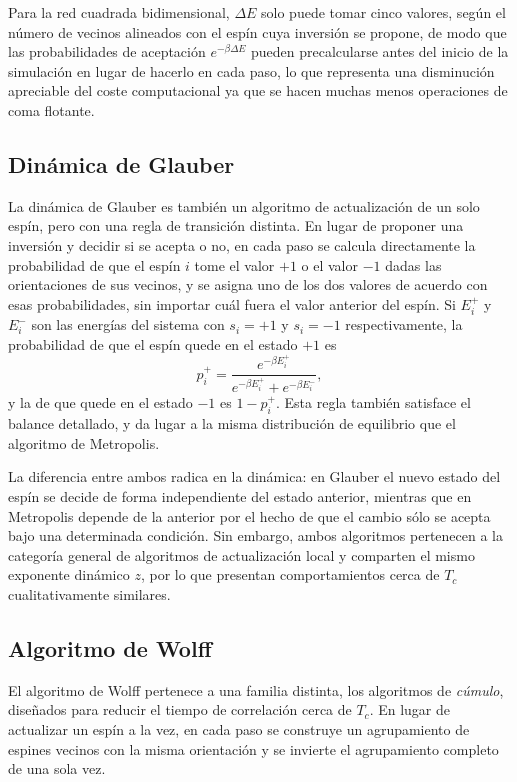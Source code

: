 Para la red cuadrada bidimensional, $\Delta E$ solo puede tomar cinco valores, según el número de vecinos alineados con el espín cuya inversión se propone, de modo que las probabilidades de aceptación $e^{-\beta\Delta E}$ pueden precalcularse antes del inicio de la simulación en lugar de hacerlo en cada paso, lo que representa una disminución apreciable del coste computacional ya que se hacen muchas menos operaciones de coma flotante.

\subsection{Dinámica de Glauber}

La dinámica de Glauber \citep{Glauber1963} es también un algoritmo de actualización de un solo espín, pero con una regla de transición distinta. En lugar de proponer una inversión y decidir si se acepta o no, en cada paso se calcula directamente la probabilidad de que el espín $i$ tome el valor $+1$ o el valor $-1$ dadas las orientaciones de sus vecinos, y se asigna uno de los dos valores de acuerdo con esas probabilidades, sin importar cuál fuera el valor anterior del espín. Si $E_i^{+}$ y $E_i^{-}$ son las energías del sistema con $s_i=+1$ y $s_i=-1$ respectivamente, la probabilidad de que el espín quede en el estado $+1$ es
\[
p_i^{+} = \frac{e^{-\beta E_i^{+}}}{e^{-\beta E_i^{+}} + e^{-\beta E_i^{-}}},
\]
y la de que quede en el estado $-1$ es $1-p_i^{+}$. Esta regla también satisface el balance detallado, y da lugar a la misma distribución de equilibrio que el algoritmo de Metropolis.

La diferencia entre ambos radica en la dinámica: en Glauber el nuevo estado del espín se decide de forma independiente del estado anterior, mientras que en Metropolis depende de la anterior por el hecho de que el cambio sólo se acepta bajo una determinada condición. Sin embargo, ambos algoritmos pertenecen a la categoría general de algoritmos de actualización local y comparten el mismo exponente dinámico $z$, por lo que presentan comportamientos cerca de $T_c$ cualitativamente similares.

\subsection{Algoritmo de Wolff}

El algoritmo de Wolff \citep{Wolff1989} pertenece a una familia distinta, los algoritmos de \textit{cúmulo}, diseñados para reducir el tiempo de correlación cerca de $T_c$. En lugar de actualizar un espín a la vez, en cada paso se construye un agrupamiento de espines vecinos con la misma orientación y se invierte el agrupamiento completo de una sola vez.

